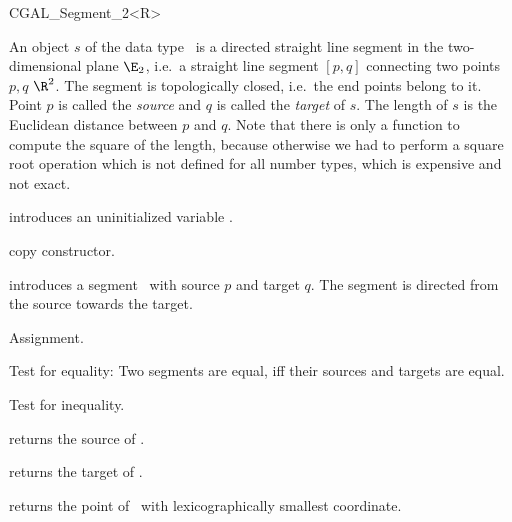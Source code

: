
\begin {classtemplate} {CGAL_Segment_2<R>}

  An object $s$ of the data type \classname\ is a directed
straight line segment in the two-dimensional plane $\E_2$, i.e.\ a
straight line segment $[p,q]$ connecting two points $p,q$ 
$\R^2$. The segment is topologically closed, i.e.\  the end
points belong to it. Point $p$ is called the {\em source} and $q$
is called the {\em target} of $s$. The length of $s$ is the
Euclidean distance between $p$ and $q$. Note that there is only a function
to compute the square of the length, because otherwise we had to
perform a square root operation which is not defined for all
number types, which is expensive and not exact.

\creation
{}


\hidden {}
             {introduces an uninitialized variable \var.}

\hidden {}
 	    {copy constructor.}

            {introduces a segment \var\ with source $p$
             and target $q$. The segment is directed from the source towards
             the target.}


\operations
\threecolumns{5cm}{4cm}

\hidden {}
        {Assignment.}

       {Test for equality: Two segments are equal, iff their sources and
        targets are equal.}

       {Test for inequality.}


       {returns the source of \var.}

       {returns the target of \var.}

       {returns the point of \var\ with lexicographically smallest coordinate.}


\end{classtemplate}
